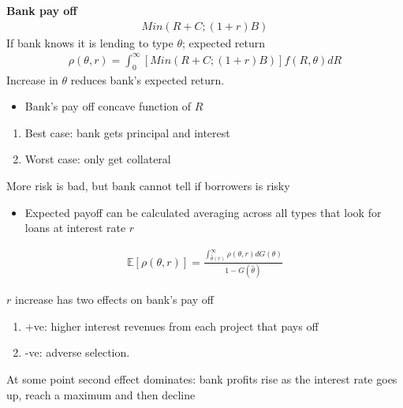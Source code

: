 \documentclass{beamer}
\begin{document}
\begin{frame}
\textbf{Bank pay off}
\begin{align}
  Min(R+C;(1+r)B)
\end{align}
 If bank knows it is lending to type $\theta$; expected return
\begin{align}
  \rho(\theta,r)=\int_0^{\infty}[Min(R+C;(1+r)B)]f(R,\theta)dR
\end{align}
 \medskip
 Increase in $\theta$ reduces bank's expected return. 
 \begin{itemize}
    \item Bank's pay off concave function of $R$
  \end{itemize}  
\end{frame}

\begin{frame}
 \begin{enumerate}
   \item Best case: bank gets principal and interest
   \item Worst case: only get collateral
 \end{enumerate}
 \medskip
 More risk is bad, but bank cannot tell if borrowers is risky
 \begin{itemize}
   \item Expected payoff can be calculated averaging across all types that look for loans at interest rate $r$
 \end{itemize}
\begin{align}
  \mathbb{E}[\rho(\theta,r)]=\frac{\int_{\hat{\theta}(r)}^{\infty}\rho(\theta,r)dG(\theta)}{1-G(\hat{\theta})}
\end{align}
\end{frame}

\begin{frame}
 $r$ increase has two effects on bank's pay off 
\begin{enumerate}
  \item +ve: higher interest revenues from each project that pays off
  \item -ve: adverse selection.   
\end{enumerate}
At some point second effect dominates: bank profits rise as the interest rate goes up, reach a maximum and then decline
\end{frame}
\end{document}
